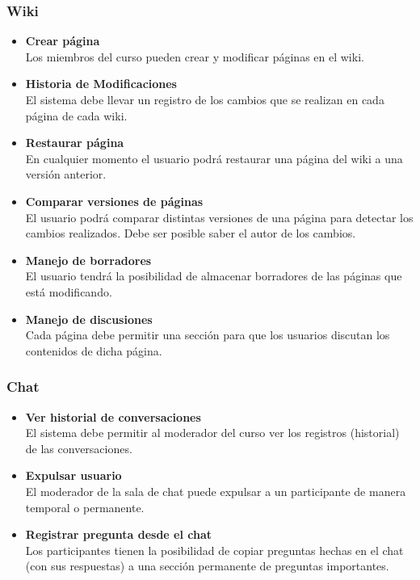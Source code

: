 \subsubsection{Wiki}
\begin{itemize}
	\item \textbf{Crear página}\\
	Los miembros del curso pueden crear y modificar páginas en el wiki.
	\item \textbf{Historia de Modificaciones}\\
	El sistema debe llevar un registro de los cambios que se realizan en cada página de cada wiki. 
	\item \textbf{Restaurar página}\\
	En cualquier momento el usuario podrá restaurar una página del wiki a una versión anterior.
	\item \textbf{Comparar versiones de páginas}\\
	El usuario podrá comparar distintas versiones de una página para detectar los cambios realizados. Debe ser posible saber el autor de los cambios.
	\item \textbf{Manejo de borradores}\\
	El usuario tendrá la posibilidad de almacenar borradores de las páginas que está modificando.
	\item \textbf{Manejo de discusiones}\\
	Cada página debe permitir una sección para que los usuarios discutan los contenidos de dicha página.
\end{itemize}

\subsubsection{Chat}
\begin{itemize}
	\item \textbf{Ver historial de conversaciones}\\
	El sistema debe permitir al moderador del curso ver los registros (historial) de las conversaciones.
	\item \textbf{Expulsar usuario}\\
	El moderador de la sala de chat puede expulsar a un participante de manera temporal o permanente.
	\item \textbf{Registrar pregunta desde el chat}\\
	Los participantes tienen la posibilidad de copiar preguntas hechas en el chat (con sus respuestas) a una sección permanente de preguntas importantes.
\end{itemize}

